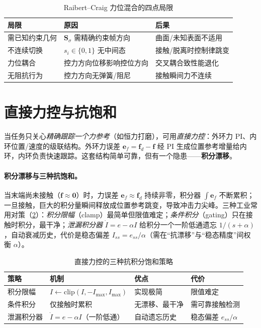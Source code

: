 \begin{table}[H]\centering\small
\caption{Raibert--Craig 力位混合的四点局限}
\label{tab:fw-rc-limits}
\begin{tabular}{lll}
\toprule
局限 & 原因 & 后果 \\
\midrule
需已知约束几何 & $\mathbf{S}_\sigma$ 需精确约束帧方向 & 曲面/未知表面不适用 \\
不连续切换 & $s_i\in\{0,1\}$ 无中间态 & 接触/脱离时控制律跳变 \\
力位耦合 & 控力方向位移影响控位方向 & 交叉耦合致性能退化 \\
无阻抗行为 & 控力方向无弹簧/阻尼 & 接触瞬间力不连续 \\
\bottomrule
\end{tabular}
\end{table}

\section{直接力控与抗饱和}
\label{sec:fw-direct}

当任务只关心\emph{精确跟踪一个力参考}（如恒力打磨），可用\emph{直接力控}：外环力 PI、内环位置/速度的级联结构。外环力误差 $\mathbf{e}_f=\mathbf{f}_d-\mathbf{f}$ 经 PI 生成位置参考增量给内环，内环负责快速跟踪。这套结构简单可靠，但有一个隐患——\textbf{积分漂移}。

\paragraph{积分漂移与三种抗饱和。}
当末端尚未接触（$\mathbf{f}\approx\mathbf{0}$）时，力误差 $\mathbf{e}_f\approx\mathbf{f}_d$ 持续非零，积分器 $\int\mathbf{e}_f$ 不断累积；一旦接触，巨大的积分量瞬间释放成位置参考跳变，导致冲击力尖峰。三种工业常用对策（\cref{tab:fw-antiwindup}）：\emph{积分限幅}（clamp）最简单但限值难定；\emph{条件积分}（gating）只在接触时积分，最干净；\emph{泄漏积分器} $\dot{I}=e-\alpha I$ 给积分一个一阶低通遗忘 $1/(s+\alpha)$，自动衰减历史，代价是稳态偏差 $I_{ss}=e_{ss}/\alpha$（需在“抗漂移”与“稳态精度”间权衡 $\alpha$）。

\begin{table}[H]\centering\small
\caption{直接力控的三种抗积分饱和策略}
\label{tab:fw-antiwindup}
\begin{tabular}{llll}
\toprule
策略 & 机制 & 优点 & 代价 \\
\midrule
积分限幅 & $I\!\leftarrow\!\mathrm{clip}(I,-I_{\max},I_{\max})$ & 实现极简 & 限值难定 \\
条件积分 & 仅接触时累积 & 无漂移、最干净 & 需可靠接触检测 \\
泄漏积分器 & $\dot I=e-\alpha I$（一阶低通） & 自动遗忘历史 & 稳态偏差 $e_{ss}/\alpha$ \\
\bottomrule
\end{tabular}
\end{table}

